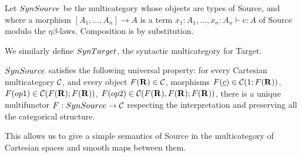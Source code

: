 \begin{definition}
    Let $SynSource$ be the multicategory whose objects are types of Source, and where a morphism 
    $[A_1,\ldots,A_n]\to A$ is a term $x_1:A_1,\ldots,x_n:A_n\vdash e:A$ of Source modulo the $\eta\beta$-laws.
    Composition is by substitution.
\end{definition}

We similarly define $SynTarget$, the syntactic multicategory for Target.

$SynSource$ satisfies the following universal property: 
for every Cartesian multicategory $\mathcal{C}$,
and every object $F(\mathbf{R})\in\mathcal{C}$, morphisms $F(\underline{c})\in\mathcal{C}(1;F(\mathbf{R}))$, 
$F(op1)\in\mathcal{C}(F(\mathbf{R});F(\mathbf{R}))$, $F(op2)\in\mathcal{C}(F(\mathbf{R}),F(\mathbf{R});F(\mathbf{R}))$, 
there is a unique multifunctor $F:SynSource\to\mathcal{C}$ respecting the interpretation and preserving all the categorical structure. 

This allows us to give a simple semantics of Source 
in the multicategory of Cartesian spaces and smooth maps between them. 

